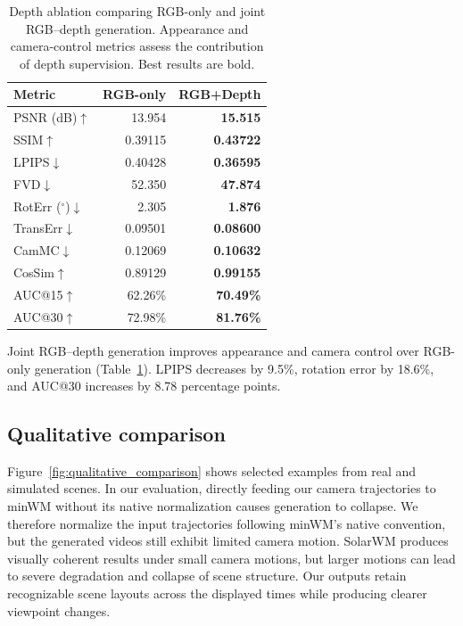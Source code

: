 \begin{table}[!htbp]
    \centering
    \caption{Depth ablation comparing RGB-only and joint RGB--depth generation. Appearance and camera-control metrics assess the contribution of depth supervision. Best results are bold.}
    \label{tab:depth_ablation}
    \small
    \setlength{\tabcolsep}{8pt}
    \begin{tabular}{@{}lrr@{}}
        \toprule
        Metric & RGB-only & RGB+Depth \\
        \midrule
        PSNR (dB)$\uparrow$ & 13.954 & \textbf{15.515} \\
        SSIM$\uparrow$ & 0.39115 & \textbf{0.43722} \\
        LPIPS$\downarrow$ & 0.40428 & \textbf{0.36595} \\
        FVD$\downarrow$ & 52.350 & \textbf{47.874} \\
        \midrule
        RotErr ($^\circ$)$\downarrow$ & 2.305 & \textbf{1.876} \\
        TransErr$\downarrow$ & 0.09501 & \textbf{0.08600} \\
        CamMC$\downarrow$ & 0.12069 & \textbf{0.10632} \\
        CosSim$\uparrow$ & 0.89129 & \textbf{0.99155} \\
        AUC@15$\uparrow$ & 62.26\% & \textbf{70.49\%} \\
        AUC@30$\uparrow$ & 72.98\% & \textbf{81.76\%} \\
        \bottomrule
    \end{tabular}
\end{table}

Joint RGB--depth generation improves appearance and camera control over RGB-only generation (Table~\ref{tab:depth_ablation}).
LPIPS decreases by 9.5\%, rotation error by 18.6\%, and AUC@30 increases by 8.78 percentage points.

\subsection{Qualitative comparison}
\label{sec:qualitative_comparison}


Figure~\ref{fig:qualitative_comparison} shows selected examples from real and simulated scenes.
In our evaluation, directly feeding our camera trajectories to minWM without its native normalization causes generation to collapse.
We therefore normalize the input trajectories following minWM's native convention, but the generated videos still exhibit limited camera motion.
SolarWM produces visually coherent results under small camera motions, but larger motions can lead to severe degradation and collapse of scene structure.
Our outputs retain recognizable scene layouts across the displayed times while producing clearer viewpoint changes.
